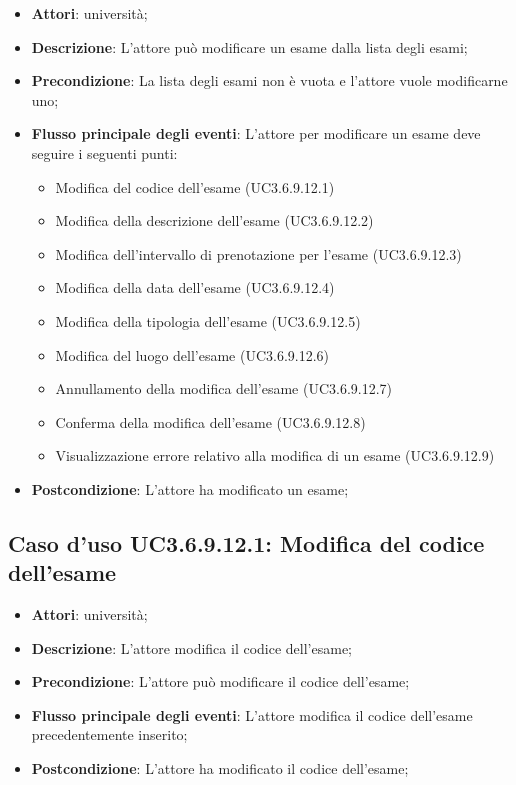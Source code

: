 \begin{itemize}
\item \textbf{Attori}: università;
\item \textbf{Descrizione}: L'attore può modificare un esame dalla lista degli esami;

\item \textbf{Precondizione}: La lista degli esami non è vuota e l'attore vuole modificarne uno;

\item \textbf{Flusso principale degli eventi}: L'attore per modificare un esame deve seguire i seguenti punti:

\begin{itemize}
\item Modifica del codice dell’esame (UC3.6.9.12.1)
\item Modifica della descrizione dell’esame (UC3.6.9.12.2)
\item Modifica dell’intervallo di prenotazione per l’esame (UC3.6.9.12.3)
\item Modifica della data dell’esame (UC3.6.9.12.4)
\item Modifica della tipologia dell’esame (UC3.6.9.12.5)
\item Modifica del luogo dell’esame (UC3.6.9.12.6)
\item Annullamento della modifica dell’esame (UC3.6.9.12.7)
\item Conferma della modifica dell’esame (UC3.6.9.12.8)
\item Visualizzazione errore relativo alla modifica di un esame (UC3.6.9.12.9)
\end{itemize}
\item \textbf{Postcondizione}: L'attore ha modificato un esame;

\end{itemize}
\subsection{Caso d'uso \texorpdfstring{UC3.6.9.12.1}{UC3.6.9.12.1}: Modifica del codice dell’esame}
\begin{itemize}
\item \textbf{Attori}: università;
\item \textbf{Descrizione}: L'attore modifica il codice dell’esame;

\item \textbf{Precondizione}: L'attore può modificare il codice dell’esame;

\item \textbf{Flusso principale degli eventi}: L'attore modifica il codice dell’esame precedentemente inserito;

\item \textbf{Postcondizione}: L'attore ha modificato il codice dell’esame;

\end{itemize}
